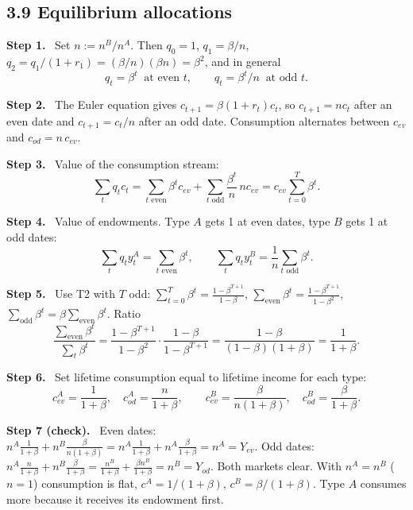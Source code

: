 \documentclass[12pt]{article}
\newcommand{\st}[1]{\par\smallskip\textbf{Step #1.}\ }
\newcommand{\ans}[1]{\[\boxed{\ #1\ }\]}
\begin{document}
\subsection*{3.9 Equilibrium allocations}
\st{1} Set $n:=n^B/n^A$. Then $q_0=1$, $q_1=\beta/n$, $q_2=q_1/(1+r_1)=(\beta/n)(\beta n)=\beta^2$, and in general
\[
q_t=\beta^t\ \text{ at even }t,\qquad q_t=\beta^t/n\ \text{ at odd }t .
\]
\st{2} The Euler equation gives $c_{t+1}=\beta(1+r_t)c_t$, so $c_{t+1}=nc_t$ after an even date and $c_{t+1}=c_t/n$ after an odd date. Consumption alternates between $c_{ev}$ and $c_{od}=n\,c_{ev}$.
\st{3} Value of the consumption stream:
\[
\sum_tq_tc_t=\sum_{t\text{ even}}\beta^tc_{ev}+\sum_{t\text{ odd}}\frac{\beta^t}{n}\,n c_{ev}=c_{ev}\sum_{t=0}^T\beta^t .
\]
\st{4} Value of endowments. Type $A$ gets 1 at even dates, type $B$ gets 1 at odd dates:
\[
\sum_tq_ty^A_t=\sum_{t\text{ even}}\beta^t,\qquad\sum_tq_ty^B_t=\frac1n\sum_{t\text{ odd}}\beta^t .
\]
\st{5} Use T2 with $T$ odd: $\sum_{t=0}^T\beta^t=\frac{1-\beta^{T+1}}{1-\beta}$, $\sum_{\text{even}}\beta^t=\frac{1-\beta^{T+1}}{1-\beta^2}$, $\sum_{\text{odd}}\beta^t=\beta\sum_{\text{even}}\beta^t$. Ratio
\[
\frac{\sum_{\text{even}}\beta^t}{\sum_{t}\beta^t}=\frac{1-\beta^{T+1}}{1-\beta^2}\cdot\frac{1-\beta}{1-\beta^{T+1}}=\frac{1-\beta}{(1-\beta)(1+\beta)}=\frac{1}{1+\beta}.
\]
\st{6} Set lifetime consumption equal to lifetime income for each type:
\ans{c^A_{ev}=\frac{1}{1+\beta},\quad c^A_{od}=\frac{n}{1+\beta},\qquad c^B_{ev}=\frac{\beta}{n(1+\beta)},\quad c^B_{od}=\frac{\beta}{1+\beta}.}
\st{7 (check)} Even dates: $n^A\frac{1}{1+\beta}+n^B\frac{\beta}{n(1+\beta)}=n^A\frac{1}{1+\beta}+n^A\frac{\beta}{1+\beta}=n^A=Y_{ev}$.
Odd dates: $n^A\frac{n}{1+\beta}+n^B\frac{\beta}{1+\beta}=\frac{n^B}{1+\beta}+\frac{\beta n^B}{1+\beta}=n^B=Y_{od}$. Both markets clear.
With $n^A=n^B$ ($n=1$) consumption is flat, $c^A=1/(1+\beta)$, $c^B=\beta/(1+\beta)$.
Type $A$ consumes more because it receives its endowment first.
\end{document}
